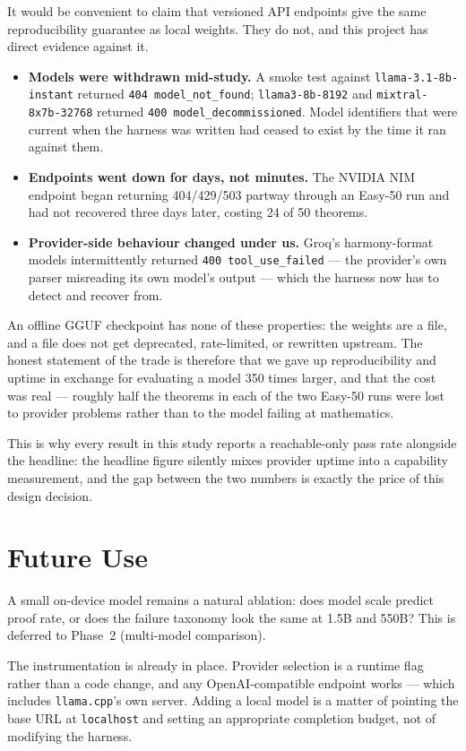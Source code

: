 It would be convenient to claim that versioned API endpoints give the same
reproducibility guarantee as local weights. They do not, and this project has
direct evidence against it.

\begin{itemize}
  \item \textbf{Models were withdrawn mid-study.} A smoke test against
        \texttt{llama-3.1-8b-instant} returned \texttt{404 model\_not\_found};
        \texttt{llama3-8b-8192} and \texttt{mixtral-8x7b-32768} returned
        \texttt{400 model\_decommissioned}. Model identifiers that were
        current when the harness was written had ceased to exist by the time
        it ran against them.
  \item \textbf{Endpoints went down for days, not minutes.} The NVIDIA NIM
        endpoint began returning 404/429/503 partway through an Easy-50 run
        and had not recovered three days later, costing 24 of 50 theorems.
  \item \textbf{Provider-side behaviour changed under us.} Groq's harmony-format
        models intermittently returned \texttt{400 tool\_use\_failed} --- the
        provider's own parser misreading its own model's output --- which the
        harness now has to detect and recover from.
\end{itemize}

An offline GGUF checkpoint has none of these properties: the weights are a
file, and a file does not get deprecated, rate-limited, or rewritten upstream.
The honest statement of the trade is therefore that we gave up
reproducibility and uptime in exchange for evaluating a model 350 times
larger, and that the cost was real --- roughly half the theorems in each of
the two Easy-50 runs were lost to provider problems rather than to the model
failing at mathematics.

This is why every result in this study reports a reachable-only pass rate
alongside the headline: the headline figure silently mixes provider uptime
into a capability measurement, and the gap between the two numbers is exactly
the price of this design decision.

\section{Future Use}

A small on-device model remains a natural ablation: does model scale predict
proof rate, or does the failure taxonomy look the same at 1.5B and 550B?
This is deferred to Phase~2 (multi-model comparison).

The instrumentation is already in place. Provider selection is a runtime flag
rather than a code change, and any OpenAI-compatible endpoint works --- which
includes \texttt{llama.cpp}'s own server. Adding a local model is a matter of
pointing the base URL at \texttt{localhost} and setting an appropriate
completion budget, not of modifying the harness.
